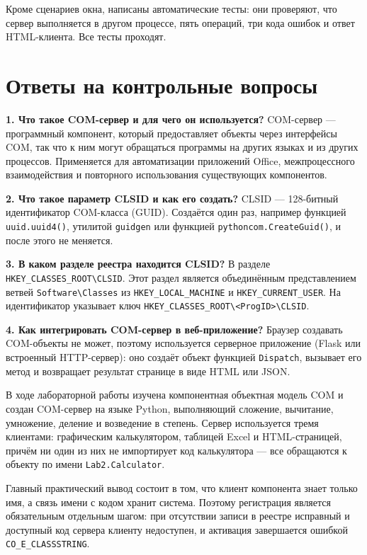 \documentclass[14pt,a4paper]{extarticle}
\begin{document}
Кроме сценариев окна, написаны автоматические тесты: они проверяют, что сервер
выполняется в другом процессе, пять операций, три кода ошибок и ответ HTML-клиента.
Все тесты проходят.

\section{Ответы на контрольные вопросы}

\textbf{1. Что такое COM-сервер и для чего он используется?} COM-сервер --- программный
компонент, который предоставляет объекты через интерфейсы COM, так что к ним могут
обращаться программы на других языках и из других процессов. Применяется для
автоматизации приложений Office, межпроцессного взаимодействия и повторного
использования существующих компонентов.

\textbf{2. Что такое параметр CLSID и как его создать?} CLSID --- 128-битный
идентификатор COM-класса (GUID). Создаётся один раз, например функцией
\texttt{uuid.uuid4()}, утилитой \texttt{guidgen} или функцией
\texttt{pythoncom.CreateGuid()}, и после этого не меняется.

\textbf{3. В каком разделе реестра находится CLSID?} В разделе
\texttt{HKEY\_CLASSES\_ROOT\textbackslash CLSID}. Этот раздел является объединённым
представлением ветвей \texttt{Software\textbackslash Classes} из
\texttt{HKEY\_LOCAL\_MACHINE} и \texttt{HKEY\_CURRENT\_USER}. На идентификатор
указывает ключ \texttt{HKEY\_CLASSES\_ROOT\textbackslash <ProgID>\textbackslash CLSID}.

\textbf{4. Как интегрировать COM-сервер в веб-приложение?} Браузер создавать
COM-объекты не может, поэтому используется серверное приложение (Flask или встроенный
HTTP-сервер): оно создаёт объект функцией \texttt{Dispatch}, вызывает его метод и
возвращает результат странице в виде HTML или JSON.


В ходе лабораторной работы изучена компонентная объектная модель COM и создан
COM-сервер на языке Python, выполняющий сложение, вычитание, умножение, деление и
возведение в степень. Сервер используется тремя клиентами: графическим калькулятором,
таблицей Excel и HTML-страницей, причём ни один из них не импортирует код
калькулятора --- все обращаются к объекту по имени \texttt{Lab2.Calculator}.

Главный практический вывод состоит в том, что клиент компонента знает только имя, а
связь имени с кодом хранит система. Поэтому регистрация является обязательным
отдельным шагом: при отсутствии записи в реестре исправный и доступный код сервера
клиенту недоступен, и активация завершается ошибкой \texttt{CO\_E\_CLASSSTRING}.
\end{document}
